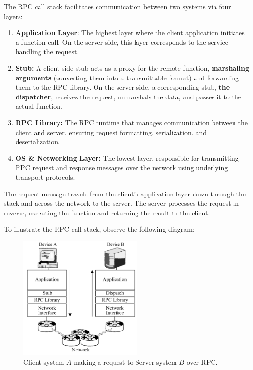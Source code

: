 \begin{Def}

    The RPC call stack facilitates communication between two systems via four layers:
    
    \begin{enumerate}
        \item \textbf{Application Layer:} The highest layer where the client application initiates a function call. On the server side, this layer corresponds to the service handling the request.
        
        \item \textbf{Stub:} A client-side stub acts as a proxy for the remote function, \textbf{marshaling arguments} (converting them into a transmittable format) and forwarding them to the RPC library. On the server side,
        a corresponding stub, \textbf{the dispatcher}, receives the request, unmarshals the data, and passes it to the actual function.
        
        \item \textbf{RPC Library:} The RPC runtime that manages communication between the client and server, ensuring request formatting, serialization, and deserialization.
        
        \item \textbf{OS \& Networking Layer:} The lowest layer, responsible for transmitting RPC request and response messages over the network using underlying transport protocols.
    \end{enumerate}
    
    The request message travels from the client's application layer down through the stack and across the network to the server. The server processes the request in reverse, executing the function and returning the result to the client.
\end{Def}
    
\newpage 

\noindent
To illustrate the RPC call stack, observe the following diagram:
\begin{figure}[h]
    \centering
    \includegraphics[width=0.55\textwidth]{Sections/rpc/rpc_stack.png}
    \caption{Client system $A$ making a request to Server system $B$ over RPC.}
    \label{fig:rpc_stack}
\end{figure}

